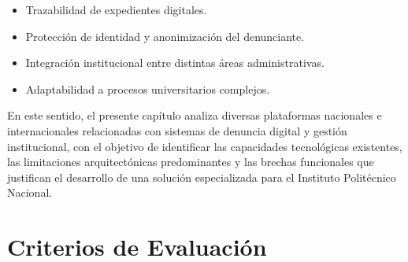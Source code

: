 \begin{flushleft}
\begin{itemize}
    \item Trazabilidad de expedientes digitales.
    
    \item Protección de identidad y anonimización del denunciante.
    
    \item Integración institucional entre distintas áreas administrativas.
    
    \item Adaptabilidad a procesos universitarios complejos.

\end{itemize}

En este sentido, el presente capítulo analiza diversas plataformas nacionales e internacionales relacionadas con sistemas de denuncia digital y gestión institucional, con el objetivo de identificar las capacidades tecnológicas existentes, las limitaciones arquitectónicas predominantes y las brechas funcionales que justifican el desarrollo de una solución especializada para el Instituto Politécnico Nacional.

\end{flushleft}


\section{Criterios de Evaluación}


